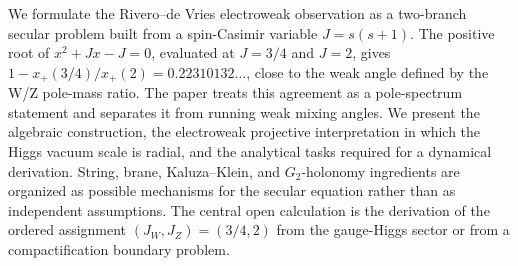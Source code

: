 We formulate the Rivero--de Vries electroweak observation as a two-branch secular problem built from a spin-Casimir variable \(J=s(s+1)\).  The positive root of \(x^2+Jx-J=0\), evaluated at \(J=3/4\) and \(J=2\), gives \(1-x_+(3/4)/x_+(2)=0.22310132\ldots\), close to the weak angle defined by the W/Z pole-mass ratio.  The paper treats this agreement as a pole-spectrum statement and separates it from running weak mixing angles.  We present the algebraic construction, the electroweak projective interpretation in which the Higgs vacuum scale is radial, and the analytical tasks required for a dynamical derivation.  String, brane, Kaluza--Klein, and \(G_2\)-holonomy ingredients are organized as possible mechanisms for the secular equation rather than as independent assumptions.  The central open calculation is the derivation of the ordered assignment \((J_W,J_Z)=(3/4,2)\) from the gauge-Higgs sector or from a compactification boundary problem.
